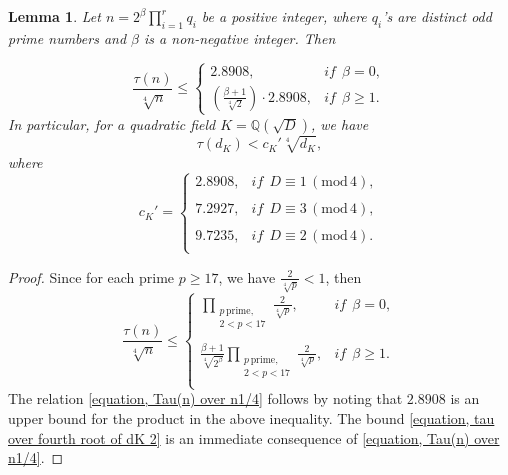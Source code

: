 \documentclass[12pt]{amsart}
\newtheorem{lemma}[theorem]{Lemma}
\theoremstyle{definition}
\numberwithin{equation}{section}
\begin{document}
\begin{lemma} \label{lemma, tau over n1/4}
	Let $n=2^{\beta} \prod_{i=1}^r q_i$ be a positive integer,  where $q_i$'s are distinct odd prime numbers and $\beta$ is a non-negative integer.
	Then 

	\begin{equation} \label{equation, Tau(n) over n1/4}
		\frac{\tau(n)}{\sqrt[4]{n}} \leq \begin{cases} 
			2.8908, &    \textit{if} ~~ \beta=0, \\
			\left(\frac{	\beta +1}{\sqrt[4]{2}}\right)\cdot 2.8908 , &    \textit{if} ~~ \beta \geq 1.
		\end{cases}
	\end{equation}
In particular, for a quadratic field $K=\mathbb{Q}(\sqrt{D})$, we have
	\begin{equation} \label{equation, tau over fourth root of dK 2}
		\tau(d_K) < c_K' \sqrt[4]{d_K},
	\end{equation}
	where
	\begin{equation*}
		c_K'=  \left\{
		\begin{array}{ll}
			2.8908, & \textit{if} ~~ D \equiv 1 \, (\mathrm{mod}\, 4),\\
			& \\
			7.2927, & \textit{if} ~~  D \equiv 3 \, (\mathrm{mod}\, 4),\\
			& \\
			9.7235,	& \textit{if} ~~ D \equiv 2 \, (\mathrm{mod}\, 4). \\
		\end{array}
		\right.
	\end{equation*}
	\end{lemma}


\begin{proof}
Since for each prime $p \geq 17$, we have $\frac{2}{\sqrt[4]{p}}<1$, then
	\begin{equation*}
		\frac{\tau(n)}{\sqrt[4]{n}} \leq  \left\{
		\begin{array}{ll}
			\displaystyle{\prod_{\substack{p \, \text{prime},\\ 2<p<17}}} \frac{2}{\sqrt[4]{p}}, &   \textit{if} ~~ \beta=0,\\
			& \\
			\frac{\beta +1}{\sqrt[4]{2^{\beta}}}	\displaystyle{\prod_{\substack{p \, \text{prime},\\ 2<p<17}}} \frac{2}{\sqrt[4]{p}}, &   \textit{if} ~~ \beta \geq 1.\\
		\end{array}
		\right.
	\end{equation*}
	The relation \eqref{equation, Tau(n) over n1/4} follows by noting that $2.8908$ is an upper bound for the product in the above inequality. The bound \eqref{equation, tau over fourth root of dK 2} is an immediate consequence of \eqref{equation, Tau(n) over n1/4}.
\end{proof}
\end{document}
